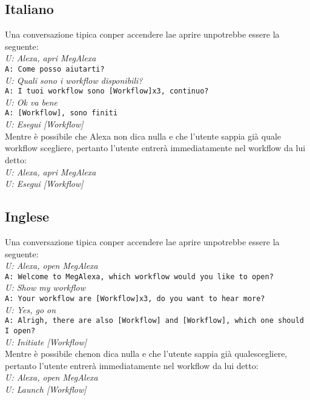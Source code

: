 \subsection{Italiano}
Una conversazione tipica conper accendere lae aprire unpotrebbe essere la seguente:\\
\newline
\textit{U: Alexa, apri MegAlexa} \\
\texttt{A: Come posso aiutarti?} \\
\textit{U: Quali sono i workflow disponibili?} \\
\texttt{A: I tuoi workflow sono [Workflow]x3, continuo?} \\
\textit{U: Ok va bene} \\
\texttt{A: [Workflow], sono finiti} \\
\textit{U: Esegui [Workflow]} \\
\newline
Mentre è possibile che Alexa non dica nulla e che l'utente sappia già quale workflow scegliere, pertanto l'utente entrerà immediatamente nel workflow da lui detto: \\
\newline
\textit{U: Alexa, apri MegAlexa}\\
\textit{U: Esegui [Workflow]}

\subsection{Inglese}
Una conversazione tipica conper accendere lae aprire unpotrebbe essere la seguente:\\
\newline
\textit{U: Alexa, open MegAlexa} \\
\texttt{A: Welcome to MegAlexa, which workflow would you like to open?}\\
\textit{U: Show my workflow}\\
\texttt{A: Your workflow are [Workflow]x3, do you want to hear more?}\\
\textit{U: Yes, go on}\\
\texttt{A: Alrigh, there are also [Workflow] and [Workflow], which one should I open?}\\
\textit{U: Initiate [Workflow]} \\
\newline
Mentre è possibile chenon dica nulla e che l'utente sappia già qualescegliere, pertanto l'utente entrerà immediatamente nel workflow da lui detto: \\
\newline
\textit{U: Alexa, open MegAlexa}\\
\textit{U: Launch [Workflow]}

